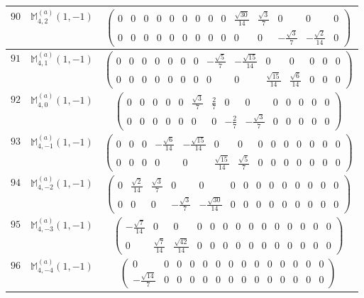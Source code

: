 \documentclass[fleqn,8pt,landscape]{jsarticle}
\begin{document}
\begin{center}
\begin{longtable}{ccc}
$ 90 $ & $ \mathbb{M}_{4,2}^{(a)}(1,-1) $ & $ \begin{pmatrix} 0 & 0 & 0 & 0 & 0 & 0 & 0 & 0 & 0 & \frac{\sqrt{30}}{14} & \frac{\sqrt{3}}{7} & 0 & 0 & 0 \\ 0 & 0 & 0 & 0 & 0 & 0 & 0 & 0 & 0 & 0 & 0 & - \frac{\sqrt{3}}{7} & - \frac{\sqrt{2}}{14} & 0 \end{pmatrix} $ \\ \hline
$ 91 $ & $ \mathbb{M}_{4,1}^{(a)}(1,-1) $ & $ \begin{pmatrix} 0 & 0 & 0 & 0 & 0 & 0 & 0 & - \frac{\sqrt{5}}{7} & - \frac{\sqrt{15}}{14} & 0 & 0 & 0 & 0 & 0 \\ 0 & 0 & 0 & 0 & 0 & 0 & 0 & 0 & 0 & \frac{\sqrt{15}}{14} & \frac{\sqrt{6}}{14} & 0 & 0 & 0 \end{pmatrix} $ \\ \hline
$ 92 $ & $ \mathbb{M}_{4,0}^{(a)}(1,-1) $ & $ \begin{pmatrix} 0 & 0 & 0 & 0 & 0 & \frac{\sqrt{3}}{7} & \frac{2}{7} & 0 & 0 & 0 & 0 & 0 & 0 & 0 \\ 0 & 0 & 0 & 0 & 0 & 0 & 0 & - \frac{2}{7} & - \frac{\sqrt{3}}{7} & 0 & 0 & 0 & 0 & 0 \end{pmatrix} $ \\ \hline
$ 93 $ & $ \mathbb{M}_{4,-1}^{(a)}(1,-1) $ & $ \begin{pmatrix} 0 & 0 & 0 & - \frac{\sqrt{6}}{14} & - \frac{\sqrt{15}}{14} & 0 & 0 & 0 & 0 & 0 & 0 & 0 & 0 & 0 \\ 0 & 0 & 0 & 0 & 0 & \frac{\sqrt{15}}{14} & \frac{\sqrt{5}}{7} & 0 & 0 & 0 & 0 & 0 & 0 & 0 \end{pmatrix} $ \\ \hline
$ 94 $ & $ \mathbb{M}_{4,-2}^{(a)}(1,-1) $ & $ \begin{pmatrix} 0 & \frac{\sqrt{2}}{14} & \frac{\sqrt{3}}{7} & 0 & 0 & 0 & 0 & 0 & 0 & 0 & 0 & 0 & 0 & 0 \\ 0 & 0 & 0 & - \frac{\sqrt{3}}{7} & - \frac{\sqrt{30}}{14} & 0 & 0 & 0 & 0 & 0 & 0 & 0 & 0 & 0 \end{pmatrix} $ \\ \hline
$ 95 $ & $ \mathbb{M}_{4,-3}^{(a)}(1,-1) $ & $ \begin{pmatrix} - \frac{\sqrt{7}}{14} & 0 & 0 & 0 & 0 & 0 & 0 & 0 & 0 & 0 & 0 & 0 & 0 & 0 \\ 0 & \frac{\sqrt{7}}{14} & \frac{\sqrt{42}}{14} & 0 & 0 & 0 & 0 & 0 & 0 & 0 & 0 & 0 & 0 & 0 \end{pmatrix} $ \\ \hline
$ 96 $ & $ \mathbb{M}_{4,-4}^{(a)}(1,-1) $ & $ \begin{pmatrix} 0 & 0 & 0 & 0 & 0 & 0 & 0 & 0 & 0 & 0 & 0 & 0 & 0 & 0 \\ - \frac{\sqrt{14}}{7} & 0 & 0 & 0 & 0 & 0 & 0 & 0 & 0 & 0 & 0 & 0 & 0 & 0 \end{pmatrix} $ \\ \hline

\end{longtable}
\end{center}
\end{document}
